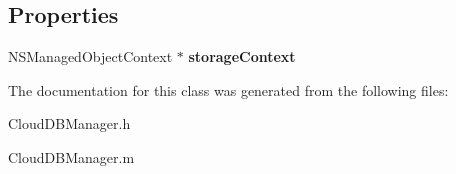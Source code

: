 \subsection*{\-Properties}
\begin{DoxyCompactItemize}
\item 
\hypertarget{interface_cloud_d_b_manager_a253c3322ee99f3b07292aac9ed970ca4}{
\-N\-S\-Managed\-Object\-Context $\ast$ {\bfseries storage\-Context}}
\label{interface_cloud_d_b_manager_a253c3322ee99f3b07292aac9ed970ca4}

\end{DoxyCompactItemize}


\-The documentation for this class was generated from the following files\-:\begin{DoxyCompactItemize}
\item 
\-Cloud\-D\-B\-Manager.\-h\item 
\-Cloud\-D\-B\-Manager.\-m\end{DoxyCompactItemize}
